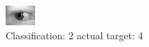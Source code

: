 \begin{figure}[h!]
\begin{center}
\includegraphics[width=0.60\columnwidth]{figures/ID810_class_2_target_4.png}
\end{center}
\caption{ Classification: 2 actual target: 4}
\label{fig:ID810_class_2_target_4}
\end{figure}
